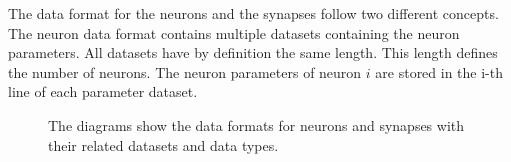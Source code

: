 The data format for the neurons and the synapses follow two different concepts.
The neuron data format contains multiple datasets containing the neuron parameters.
All datasets have by definition the same length. This length defines the number of neurons.
The neuron parameters of neuron $i$ are stored in the i-th line of each parameter dataset.
\begin{figure}[ht!]
   	\begin{center}
        \hspace{1cm}
    	   \end{center}
    	\caption{%
        The diagrams show the data formats for neurons and synapses with their related datasets and data types.
     }%
   \label{fig:atlas}
   \end{figure}
   
